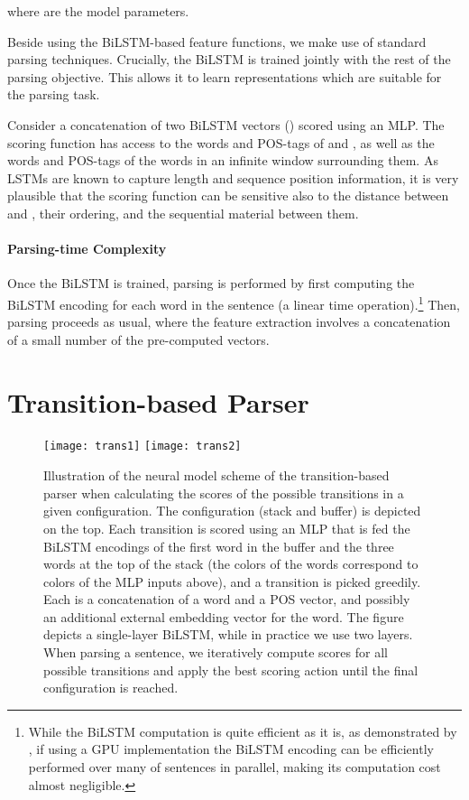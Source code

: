 \documentclass[11pt]{article}
\begin{document}
where
 are the model parameters.

Beside using the BiLSTM-based feature functions, we make use of standard parsing
techniques.  Crucially, the \mbox{BiLSTM} is trained jointly with the rest of the
parsing objective.  This allows it to learn representations which are suitable
for the parsing task.

Consider a concatenation of two \mbox{BiLSTM} vectors () scored using an MLP.
The scoring function has access to the words and POS-tags of  and , as
well as the words and POS-tags of the words in an infinite window surrounding
them.  As LSTMs are known to capture length and sequence position information, it is very
plausible that the scoring function can be sensitive also to the distance
between  and , their ordering, and the sequential material between them.

\paragraph{Parsing-time Complexity}
Once the \mbox{BiLSTM} is trained, parsing is performed by first computing the BiLSTM
encoding  for each word in the sentence (a linear time operation).\footnote{
While the \mbox{BiLSTM} computation is quite efficient as it is, as demonstrated by ,
if using a GPU implementation the \mbox{BiLSTM} encoding
can be efficiently performed over many of sentences in parallel, making its computation cost
almost negligible.}
Then,
parsing proceeds as usual, where the feature extraction involves a concatenation
of a small number of the pre-computed  vectors.

\section{Transition-based Parser}
\label{sec:archybrid}

\begin{figure*}[ht!]
\texttt{[image: trans1]}
\texttt{[image: trans2]}

\caption{\small Illustration of the neural model scheme of the transition-based parser when calculating the scores of the possible transitions in a given configuration.
The configuration (stack and buffer) is depicted on the top. Each transition is scored using an MLP that is fed the \mbox{BiLSTM} encodings of the first word in the buffer and the three words at the top of the stack (the colors of the words correspond to colors of the MLP inputs above), and a transition is picked greedily. Each  is a concatenation of a word and a POS vector, and possibly an additional external embedding vector for the word. The figure depicts a single-layer BiLSTM, while in practice we use two layers. When parsing a sentence, we iteratively compute scores for all possible transitions and apply the best scoring action until the final configuration is reached.}
\label{fig:firstorder}
\end{figure*}
\end{document}
